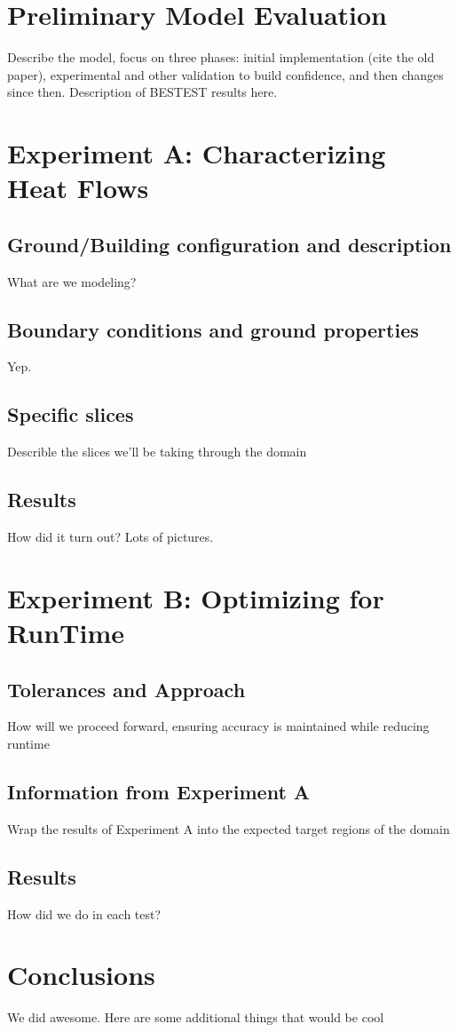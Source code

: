 \documentclass{article}
\begin{document}
 \section*{Preliminary Model Evaluation} 
  Describe the model, focus on three phases: initial implementation (cite the old paper), experimental and other validation to build confidence, and then changes since then.  Description of BESTEST results here.
  \lipsum[1]
 
 \section*{Experiment A: Characterizing Heat Flows}
  \lipsum[1]

  \subsection*{Ground/Building configuration and description}
   What are we modeling?

  \subsection*{Boundary conditions and ground properties}
   Yep. 

  \subsection*{Specific slices}
   Describle the slices we'll be taking through the domain 

  \subsection*{Results}
   How did it turn out?  Lots of pictures.

 \section*{Experiment B: Optimizing for RunTime}
  \lipsum[1]

  \subsection*{Tolerances and Approach}
   How will we proceed forward, ensuring accuracy is maintained while reducing runtime

  \subsection*{Information from Experiment A}
   Wrap the results of Experiment A into the expected target regions of the domain

  \subsection*{Results}
   How did we do in each test?

 \section*{Conclusions}
  We did awesome.  Here are some additional things that would be cool
  \lipsum[1]

 
  
\end{document}
